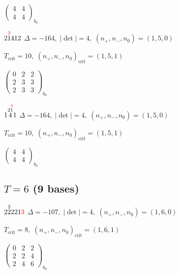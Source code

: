 \documentclass[10pt]{article}
\begin{document}
\hspace{2em}$\left(\begin{smallmatrix}4 & 4 \\ 4 & 4\end{smallmatrix}\right)_{\!b_0}$

\smallskip

$2\overset{\textcolor{red}{3}}{1}412$ \quad $\Delta=-164,\; |\det|=4,\; (n_+,n_-,n_0)=(1,5,0)$

\hspace{1em}$T_{\text{crit}}=10,\; (n_+,n_-,n_0)_{\text{crit}}=(1,5,1)$

\hspace{2em}$\left(\begin{smallmatrix}0 & 2 & 2 \\ 2 & 3 & 3 \\ 2 & 3 & 3\end{smallmatrix}\right)_{\!b_0}$

\smallskip

$1\overset{2\overset{\textcolor{red}{3}}{1}}{4}1$ \quad $\Delta=-164,\; |\det|=4,\; (n_+,n_-,n_0)=(1,5,0)$

\hspace{1em}$T_{\text{crit}}=10,\; (n_+,n_-,n_0)_{\text{crit}}=(1,5,1)$

\hspace{2em}$\left(\begin{smallmatrix}4 & 4 \\ 4 & 4\end{smallmatrix}\right)_{\!b_0}$


\subsection*{$T = 6$ \quad (9 bases)}
\smallskip

$2\overset{2}{2}221\textcolor{red}{3}$ \quad $\Delta=-107,\; |\det|=4,\; (n_+,n_-,n_0)=(1,6,0)$

\hspace{1em}$T_{\text{crit}}=8,\; (n_+,n_-,n_0)_{\text{crit}}=(1,6,1)$

\hspace{2em}$\left(\begin{smallmatrix}0 & 2 & 2 \\ 2 & 2 & 4 \\ 2 & 4 & 6\end{smallmatrix}\right)_{\!b_0}$
\end{document}
